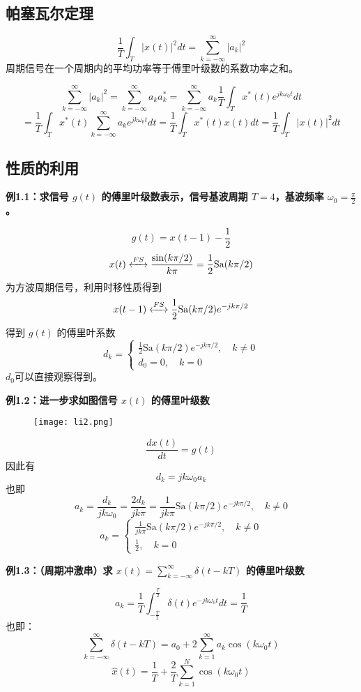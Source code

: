 \documentclass[UTF8]{report}
\theoremstyle{MyLineTheoremStyle} %
\theoremstyle{MyBlockTheoremStyle} %
\theoremstyle{MySubsubsectionStyle} %
\begin{document}
\subsection{帕塞瓦尔定理}
\[
\frac{1}{T} \int_{T} |x(t)|^2 dt = \sum_{k=-\infty}^{\infty} |a_k|^2
\]
周期信号在一个周期内的平均功率等于傅里叶级数的系数功率之和。

\[
\sum_{k=-\infty}^{\infty} |a_k|^2 = \sum_{k=-\infty}^{\infty} a_k a_k^* = \sum_{k=-\infty}^{\infty} a_k \frac{1}{T} \int_{T} x^*(t) e^{jk\omega_0 t} dt
\]
\[
= \frac{1}{T} \int_{T} x^*(t) \sum_{k=-\infty}^{\infty} a_k e^{jk\omega_0 t} dt = \frac{1}{T} \int_{T} x^*(t) x(t) dt = \frac{1}{T} \int_{T} |x(t)|^2 dt
\]

\subsection{性质的利用}
\textbf{例1.1：求信号 $g(t)$ 的傅里叶级数表示，信号基波周期 $T = 4$，基波频率 $\omega_0 = \frac{\pi}{2}$。}

\[
g(t) = x(t - 1) - \frac{1}{2}
\]
\[
x(t) \xleftrightarrow{FS} \frac{\sin(k\pi/2)}{k\pi} = \frac{1}{2} \text{Sa}(k\pi/2)
\]
为方波周期信号，利用时移性质得到
\[
x(t - 1) \xleftrightarrow{FS} \frac{1}{2} \text{Sa}(k\pi/2) e^{-jk\pi/2}
\]
得到 $g(t)$ 的傅里叶系数
\[
d_k = \begin{cases}
\frac{1}{2} \text{Sa}(k\pi/2) e^{-jk\pi/2}, \quad k \neq 0\\
d_0 = 0, \quad k = 0
\end{cases}
\]
$d_0$可以直接观察得到。

\textbf{例1.2：进一步求如图信号 $x(t)$ 的傅里叶级数}
\begin{figure}[h]
    \centering
    \texttt{[image: li2.png]} %
\end{figure}

\[
\frac{d x(t)}{dt} = g(t)
\]
因此有
\[
d_k = jk\omega_0 a_k
\]
也即
\[
a_k = \frac{d_k}{jk\omega_0} = \frac{2d_k}{jk\pi} = \frac{1}{jk\pi} \text{Sa}(k\pi/2) e^{-jk\pi/2}, \quad k \neq 0
\]
\[a_k = \begin{cases}
\frac{1}{jk\pi} \text{Sa}(k\pi/2) e^{-jk\pi/2}, \quad k \neq 0\\
\frac{1}{2}, \quad k = 0
\end{cases}
\]


\textbf{例1.3：（周期冲激串）求 $x(t) = \sum_{k=-\infty}^{\infty} \delta(t - kT)$ 的傅里叶级数}

\[
a_k = \frac{1}{T} \int_{-\frac{T}{2}}^{\frac{T}{2}} \delta(t) e^{-jk\omega_0 t} dt = \frac{1}{T}
\]
也即：
\[
\sum_{k=-\infty}^{\infty} \delta(t - kT) = a_0 + 2 \sum_{k=1}^{\infty} a_k \cos(k\omega_0 t)
\]
\[
\hat{x}(t) = \frac{1}{T} + \frac{2}{T} \sum_{k=1}^{N} \cos(k\omega_0 t)
\]
\end{document}
